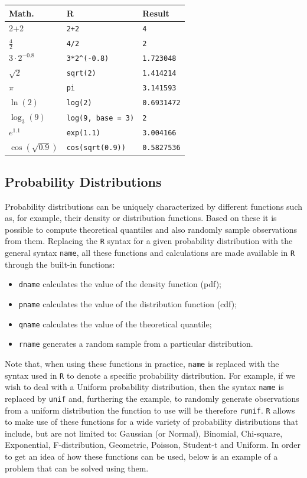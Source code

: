 \documentclass[12pt,]{krantz}
\providecommand{\tightlist}{%
  \setlength{\itemsep}{0pt}\setlength{\parskip}{0pt}}
\begin{document}
\begin{longtable}[]{@{}lll@{}}
\toprule
Math. & R & Result\tabularnewline
\midrule
\endhead
2+2 & \texttt{2+2} & \texttt{4}\tabularnewline
\(\frac{4}{2}\) & \texttt{4/2} & \texttt{2}\tabularnewline
\(3 \cdot 2^{-0.8}\) & \texttt{3*2\^{}(-0.8)} &
\texttt{1.723048}\tabularnewline
\(\sqrt{2}\) & \texttt{sqrt(2)} & \texttt{1.414214}\tabularnewline
\(\pi\) & \texttt{pi} & \texttt{3.141593}\tabularnewline
\(\ln(2)\) & \texttt{log(2)} & \texttt{0.6931472}\tabularnewline
\(\log_{3}(9)\) & \texttt{log(9,\ base\ =\ 3)} &
\texttt{2}\tabularnewline
\(e^{1.1}\) & \texttt{exp(1.1)} & \texttt{3.004166}\tabularnewline
\(\cos(\sqrt{0.9})\) & \texttt{cos(sqrt(0.9))} &
\texttt{0.5827536}\tabularnewline
\bottomrule
\end{longtable}

\subsection{Probability Distributions}\label{probability-distributions}

Probability distributions can be uniquely characterized by different
functions such as, for example, their density or distribution functions.
Based on these it is possible to compute theoretical quantiles and also
randomly sample observations from them. Replacing the \texttt{R} syntax
for a given probability distribution with the general syntax
\texttt{name}, all these functions and calculations are made available
in \texttt{R} through the built-in functions:

\begin{itemize}
\tightlist
\item
  \texttt{dname} calculates the value of the density function (pdf);
\item
  \texttt{pname} calculates the value of the distribution function
  (cdf);
\item
  \texttt{qname} calculates the value of the theoretical quantile;
\item
  \texttt{rname} generates a random sample from a particular
  distribution.
\end{itemize}

Note that, when using these functions in practice, \texttt{name} is
replaced with the syntax used in \texttt{R} to denote a specific
probability distribution. For example, if we wish to deal with a Uniform
probability distribution, then the syntax \texttt{name} is replaced by
\texttt{unif} and, furthering the example, to randomly generate
observations from a uniform distribution the function to use will be
therefore \texttt{runif}. \texttt{R} allows to make use of these
functions for a wide variety of probability distributions that include,
but are not limited to: Gaussian (or Normal), Binomial, Chi-square,
Exponential, F-distribution, Geometric, Poisson, Student-t and Uniform.
In order to get an idea of how these functions can be used, below is an
example of a problem that can be solved using them.
\end{document}
